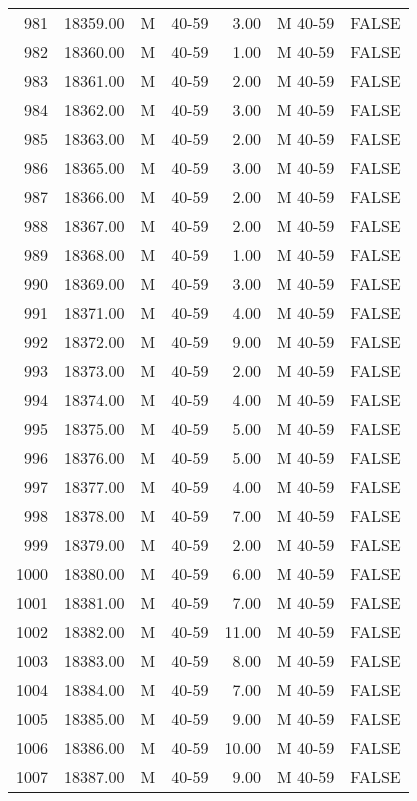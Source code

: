 \begin{table}[ht]
\begin{tabular}{rrllrll}
  981 & 18359.00 & M & 40-59 & 3.00 & M 40-59 & FALSE \\ 
  982 & 18360.00 & M & 40-59 & 1.00 & M 40-59 & FALSE \\ 
  983 & 18361.00 & M & 40-59 & 2.00 & M 40-59 & FALSE \\ 
  984 & 18362.00 & M & 40-59 & 3.00 & M 40-59 & FALSE \\ 
  985 & 18363.00 & M & 40-59 & 2.00 & M 40-59 & FALSE \\ 
  986 & 18365.00 & M & 40-59 & 3.00 & M 40-59 & FALSE \\ 
  987 & 18366.00 & M & 40-59 & 2.00 & M 40-59 & FALSE \\ 
  988 & 18367.00 & M & 40-59 & 2.00 & M 40-59 & FALSE \\ 
  989 & 18368.00 & M & 40-59 & 1.00 & M 40-59 & FALSE \\ 
  990 & 18369.00 & M & 40-59 & 3.00 & M 40-59 & FALSE \\ 
  991 & 18371.00 & M & 40-59 & 4.00 & M 40-59 & FALSE \\ 
  992 & 18372.00 & M & 40-59 & 9.00 & M 40-59 & FALSE \\ 
  993 & 18373.00 & M & 40-59 & 2.00 & M 40-59 & FALSE \\ 
  994 & 18374.00 & M & 40-59 & 4.00 & M 40-59 & FALSE \\ 
  995 & 18375.00 & M & 40-59 & 5.00 & M 40-59 & FALSE \\ 
  996 & 18376.00 & M & 40-59 & 5.00 & M 40-59 & FALSE \\ 
  997 & 18377.00 & M & 40-59 & 4.00 & M 40-59 & FALSE \\ 
  998 & 18378.00 & M & 40-59 & 7.00 & M 40-59 & FALSE \\ 
  999 & 18379.00 & M & 40-59 & 2.00 & M 40-59 & FALSE \\ 
  1000 & 18380.00 & M & 40-59 & 6.00 & M 40-59 & FALSE \\ 
  1001 & 18381.00 & M & 40-59 & 7.00 & M 40-59 & FALSE \\ 
  1002 & 18382.00 & M & 40-59 & 11.00 & M 40-59 & FALSE \\ 
  1003 & 18383.00 & M & 40-59 & 8.00 & M 40-59 & FALSE \\ 
  1004 & 18384.00 & M & 40-59 & 7.00 & M 40-59 & FALSE \\ 
  1005 & 18385.00 & M & 40-59 & 9.00 & M 40-59 & FALSE \\ 
  1006 & 18386.00 & M & 40-59 & 10.00 & M 40-59 & FALSE \\ 
  1007 & 18387.00 & M & 40-59 & 9.00 & M 40-59 & FALSE \\ 

\end{tabular}
\end{table}
